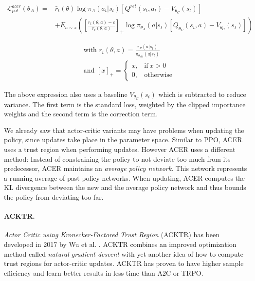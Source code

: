 \begin{align*}
  \mathcal{L}^{acer}_{pol}(\theta_A) = &\bar{r}_t(\theta) \log \pi_A(a_t|s_t)[Q^{ret}(s_t, a_t) - V_{\theta_C}(s_t)] \\ 
  &+ E_{a\sim\pi} \left(\left[\frac{r_t(\theta, a) - c}{r_t(\theta, a)}\right]_{+} \log \pi_{\theta_A}(a|s_t)[Q_{\theta_C}(s_t, a) - V_{\theta_C}(s_t)] \right)
\end{align*}

\begin{align*}
  &\text{with } r_t(\theta, a) = \frac{\pi_\theta(a|s_t)}{\pi_{\theta_{old}}(a|s_t)} \\
  &\text{and } [x]_+ = 
  \begin{cases} 
    x, & \text{if}\ x > 0 \\
    0, & \text{otherwise}
  \end{cases}  
\end{align*}
 

The above expression also uses a baseline $V_{\theta_C}(s_t)$ which is subtracted to reduce variance. The first term is the standard loss, weighted by the clipped importance weights and the second term is the correction term.

We already saw that actor-critic variants may have problems when updating the policy, since updates take place in the parameter space. Similar to PPO, ACER uses a trust region when performing updates. However ACER uses a different method: Instead of constraining the policy to not deviate too much from its predecessor, ACER maintains an \textit{average policy network}. This network represents a running average of past policy networks. When updating, ACER computes the KL divergence between the new and the average policy network and thus bounds the policy from deviating too far.

\paragraph{ACKTR.} \textit{Actor Critic using Kronecker-Factored Trust Region} (ACKTR) has been developed in 2017 by Wu et al. \cite{wu2017scalable}. ACKTR combines an improved optimization method called \textit{natural gradient descent} with yet another idea of how to compute trust regions for actor-critic updates. ACKTR has proven to have higher sample efficiency and learn better results in less time than A2C or TRPO. 

